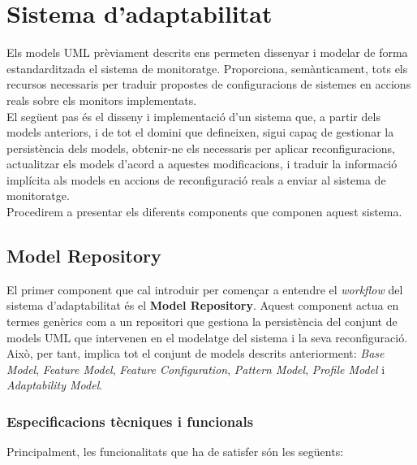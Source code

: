 
\chapter{Sistema d'adaptabilitat} %

\label{DissenySistema} %

Els models UML prèviament descrits ens permeten dissenyar i modelar de forma estandarditzada el sistema de monitoratge. Proporciona, semànticament, tots els recursos necessaris per traduir propostes de configuracions de sistemes en accions reals sobre els monitors implementats.\\

El següent pas és el disseny i implementació d'un sistema que, a partir dels models anteriors, i de tot el domini que defineixen, sigui capaç de gestionar la persistència dels models, obtenir-ne els necessaris per aplicar reconfiguracions, actualitzar els models d'acord a aquestes modificacions, i traduir la informació implícita als models en accions de reconfiguració reals a enviar al sistema de monitoratge.\\

Procedirem a presentar els diferents components que componen aquest sistema.

\section{Model Repository}

El primer component que cal introduir per començar a entendre el \textit{workflow} del sistema d'adaptabilitat és el \textbf{Model Repository}. Aquest component actua en termes genèrics com a un repositori que gestiona la persistència del conjunt de models UML que intervenen en el modelatge del sistema i la seva reconfiguració. Això, per tant, implica tot el conjunt de models descrits anteriorment: \textit{Base Model}, \textit{Feature Model}, \textit{Feature Configuration}, \textit{Pattern Model}, \textit{Profile Model} i \textit{Adaptability Model}.\\

\subsection{Especificacions tècniques i funcionals}

Principalment, les funcionalitats que ha de satisfer són les següents:

